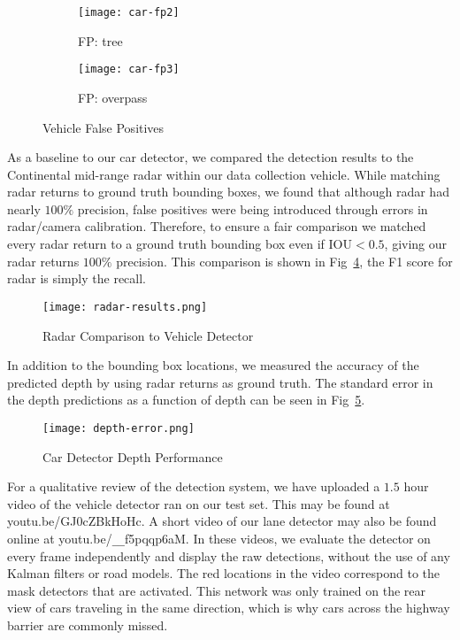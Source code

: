 \documentclass[journal]{IEEEtran}
\begin{document}
\begin{figure}[tb]
        \centering
        \begin{subfigure}[b]{1.7in}%
                \texttt{[image: car-fp2]}
                \caption{FP: tree}
                \label{fig:car-tree}
        \end{subfigure}%
        \begin{subfigure}[b]{1.7in}
                \texttt{[image: car-fp3]}
                \caption{FP: overpass}
                \label{fig:car-overpass}
        \end{subfigure}
        \caption{Vehicle False Positives}\label{fig:car-fp}
\end{figure}

As a baseline to our car detector, we compared the detection results to the Continental mid-range radar within our data collection vehicle. While matching radar returns to ground truth bounding boxes, we found that although radar had nearly $100\%$ precision, false positives were being introduced through errors in radar/camera calibration. Therefore, to ensure a fair comparison we matched every radar return to a ground truth bounding box even if IOU$<0.5$, giving our radar returns $100\%$ precision. This comparison is shown in Fig~\ref{fig:nn-v-radar}, the F1 score for radar is simply the recall.

\begin{figure}[tb]
  \centering
    \texttt{[image: radar-results.png]}
 \caption{Radar Comparison to Vehicle Detector}
 \label{fig:nn-v-radar}
\end{figure}


In addition to the bounding box locations, we measured the accuracy of the predicted depth by using radar returns as ground truth. The standard error in the depth predictions as a function of depth can be seen in Fig~\ref{fig:car-depth-error}.

\begin{figure}[tb]
  \centering
    \texttt{[image: depth-error.png]}
 \caption{Car Detector Depth Performance}
 \label{fig:car-depth-error}
\end{figure}


For a qualitative review of the detection system, we have uploaded a $1.5$ hour video of the vehicle detector ran on our test set. This may be found at youtu.be/GJ0cZBkHoHc. A short video of our lane detector may also be found online at youtu.be/\texttt{\_\_}f5pqqp6aM. In these videos, we evaluate the detector on every frame independently and display the raw detections, without the use of any Kalman filters or road models. The red locations in the video correspond to the mask detectors that are activated. This network was only trained on the rear view of cars traveling in the same direction, which is why cars across the highway barrier are commonly missed.
\end{document}
